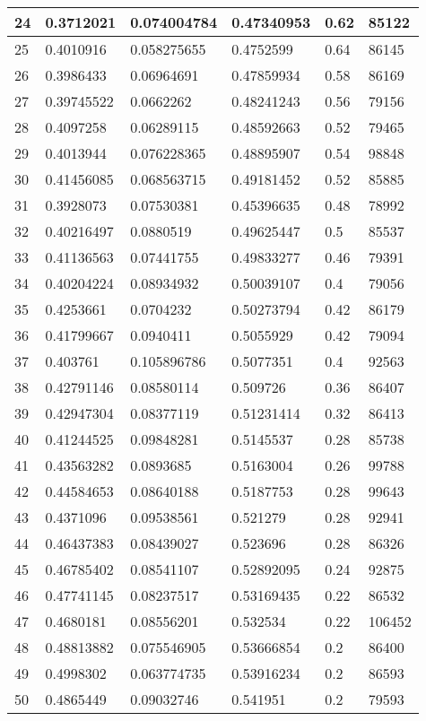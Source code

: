 \begin{longtable}{|l|l|l|l|l|l|}
24 & 0.3712021 & 0.074004784 & 0.47340953 & 0.62 & 85122 \\ \hline 
25 & 0.4010916 & 0.058275655 & 0.4752599 & 0.64 & 86145 \\ \hline 
26 & 0.3986433 & 0.06964691 & 0.47859934 & 0.58 & 86169 \\ \hline 
27 & 0.39745522 & 0.0662262 & 0.48241243 & 0.56 & 79156 \\ \hline 
28 & 0.4097258 & 0.06289115 & 0.48592663 & 0.52 & 79465 \\ \hline 
29 & 0.4013944 & 0.076228365 & 0.48895907 & 0.54 & 98848 \\ \hline 
30 & 0.41456085 & 0.068563715 & 0.49181452 & 0.52 & 85885 \\ \hline 
31 & 0.3928073 & 0.07530381 & 0.45396635 & 0.48 & 78992 \\ \hline 
32 & 0.40216497 & 0.0880519 & 0.49625447 & 0.5 & 85537 \\ \hline 
33 & 0.41136563 & 0.07441755 & 0.49833277 & 0.46 & 79391 \\ \hline 
34 & 0.40204224 & 0.08934932 & 0.50039107 & 0.4 & 79056 \\ \hline 
35 & 0.4253661 & 0.0704232 & 0.50273794 & 0.42 & 86179 \\ \hline 
36 & 0.41799667 & 0.0940411 & 0.5055929 & 0.42 & 79094 \\ \hline 
37 & 0.403761 & 0.105896786 & 0.5077351 & 0.4 & 92563 \\ \hline 
38 & 0.42791146 & 0.08580114 & 0.509726 & 0.36 & 86407 \\ \hline 
39 & 0.42947304 & 0.08377119 & 0.51231414 & 0.32 & 86413 \\ \hline 
40 & 0.41244525 & 0.09848281 & 0.5145537 & 0.28 & 85738 \\ \hline 
41 & 0.43563282 & 0.0893685 & 0.5163004 & 0.26 & 99788 \\ \hline 
42 & 0.44584653 & 0.08640188 & 0.5187753 & 0.28 & 99643 \\ \hline 
43 & 0.4371096 & 0.09538561 & 0.521279 & 0.28 & 92941 \\ \hline 
44 & 0.46437383 & 0.08439027 & 0.523696 & 0.28 & 86326 \\ \hline 
45 & 0.46785402 & 0.08541107 & 0.52892095 & 0.24 & 92875 \\ \hline 
46 & 0.47741145 & 0.08237517 & 0.53169435 & 0.22 & 86532 \\ \hline 
47 & 0.4680181 & 0.08556201 & 0.532534 & 0.22 & 106452 \\ \hline 
48 & 0.48813882 & 0.075546905 & 0.53666854 & 0.2 & 86400 \\ \hline 
49 & 0.4998302 & 0.063774735 & 0.53916234 & 0.2 & 86593 \\ \hline 
50 & 0.4865449 & 0.09032746 & 0.541951 & 0.2 & 79593 \\ \hline 
\end{longtable}